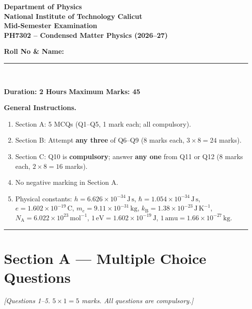 \documentclass[11pt,a4paper]{article}
\newcommand{\kB}{k_{\mathrm{B}}}
\begin{document}
\begin{center}
    {\Large\bfseries Department of Physics}\\[2pt]
    {\Large\bfseries National Institute of Technology Calicut}\\[10pt]
    {\Huge\bfseries Mid-Semester Examination}\\[4pt]
    {\LARGE\bfseries PH7302 -- Condensed Matter Physics (2026--27)}\\[4pt]
    {\large\bfseries Roll No \& Name: \rule{0.45\linewidth}{0.4pt}}\\[10pt]
\end{center}

\noindent\textbf{Duration: 2 Hours} \hfill
\textbf{Maximum Marks: 45}\par\vspace{2pt}

\noindent\textbf{General Instructions.}
\begin{enumerate}[leftmargin=*,itemsep=2pt]
    \item Section A: 5 MCQs (Q1--Q5, 1 mark each; all compulsory).
    \item Section B: Attempt \textbf{any three} of Q6--Q9 (8 marks each, $3 \times 8 = 24$ marks).
    \item Section C: Q10 is \textbf{compulsory}; answer \textbf{any one} from Q11 or Q12 (8 marks each, $2 \times 8 = 16$ marks).
    \item No negative marking in Section A.
    \item Physical constants:
          $h = 6.626\times10^{-34}\,\mathrm{J\,s}$, $\hbar = 1.054\times10^{-34}\,\mathrm{J\,s}$, $e = 1.602\times10^{-19}\,\mathrm{C}$, $m_{e}=9.11\times10^{-31}\,\mathrm{kg}$, $\kB=1.38\times10^{-23}\,\mathrm{J\,K^{-1}}$, $N_{\mathrm{A}}=6.022\times10^{23}\,\mathrm{mol^{-1}}$, $1\,\mathrm{eV}=1.602\times10^{-19}\,\mathrm{J}$, $1\,\mathrm{amu}=1.66\times10^{-27}\,\mathrm{kg}$.
\end{enumerate}

\vspace{6pt}\hrule\vspace{10pt}

\section*{Section A --- Multiple Choice Questions}
\noindent\textit{[Questions 1--5. $5 \times 1 = 5$ marks. All questions are compulsory.]}
\vspace{4pt}
\end{document}
